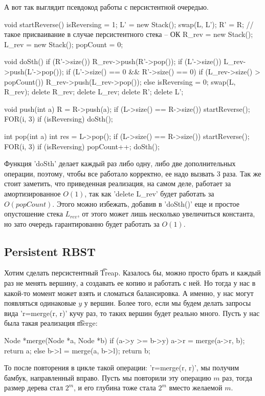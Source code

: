 А вот так выглядит псевдокод работы с персистентной очередью.

\begin{cppcode}
void startReverse(){
    isReversing = 1;
    L' = new Stack();
    swap(L, L');
    R' = R; //такое присваивание в случае персистентного стека -- ОК
    R_rev = new Stack();
    L_rev = new Stack();    
    popCount = 0;
}

void doSth(){
    if (R'->size())
        R_rev->push(R'->pop());
    if (L'->size())
        L_rev->push(L'->pop());
    if (L'->size() == 0 && R'->size() == 0) 
        if (L_rev->size() > popCount())
            R_rev->push(L_rev->pop());
        else{
            isReversing = 0;
            swap(L, R_rev);
            delete R_rev;
            delete L_rev;
            delete R';
            delete L';
        }           
}

void push(int a){
    R = R->push(a);
    if (L->size() == R->size())
        startReverse();
    FOR(i, 3)
        if (isReversing)
            doSth();
}

int pop(int a){
    int res = L->pop();
    if (L->size() == R->size())
        startReverse();
    FOR(i, 3)
        if (isReversing)
        {
            popCount++;
            doSth();
        }
}
\end{cppcode}

\begin{Rem}
    Функция \cpp'doSth' делает каждый раз либо одну, либо две дополнительных операции, поэтому, чтобы
    все работало корректно, ее надо вызвать 3 раза. 
    Так же стоит заметить, что приведенная реализация, на самом деле, работает за амортизированное $O(1)$, так как
    \cpp'delete L_rev' будет работать за $O(popCount)$. 
    Этого можно избежать, добавив в \cpp'doSth()' еще и простое опустошение стека $L_{rev}$, от этого может лишь несколько
    увеличиться константа, но зато очередь гарантированно будет работать за $O(1)$.

\end{Rem}

\subsection{Persistent RBST}

Хотим сделать персистентный \t{Treap}. Казалось бы, можно просто брать и каждый раз не менять вершину, а 
создавать ее копию и работать с ней. Но тогда у нас в какой-то момент может взять и сломаться балансировка.
А именно, у нас могут появляться одинаковые $y$ у вершин. 
Более того, если мы будем делать запросы вида \cpp'r=merge(r, r)' кучу раз, то таких вершин будет реально много.
Пусть у нас была такая реализация \t{merge}:
\begin{cppcode}
Node *merge(Node *a, Node *b){
    if (a->y >= b->y) {
        a->r = merge(a->r, b);
        return a;
    } else {
        b->l = merge(a, b->l);
        return b;
    }
}   
\end{cppcode}
То после повторения в цикле такой операции: \cpp'r=merge(r, r)', мы получим бамбук, направленный вправо.
Пусть мы повторили эту операцию $m$ раз, тогда размер дерева стал $2^m$, и его глубина тоже стала $2^m$ 
вместо желаемой $m$.

